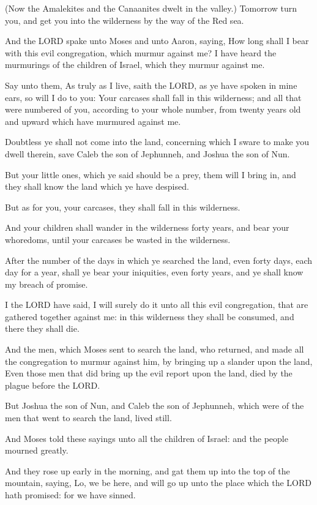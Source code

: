 \Verse (Now the Amalekites and the Canaanites dwelt in the valley.)
Tomorrow turn you, and get you into the wilderness by the way of the
Red sea.

\Verse And the LORD spake unto Moses and unto Aaron, saying, \Verse How
long shall I bear with this evil congregation, which murmur against
me? I have heard the murmurings of the children of Israel, which they
murmur against me.

\Verse Say unto them, As truly as I live, saith the LORD, as ye have
spoken in mine ears, so will I do to you: \Verse Your carcases shall
fall in this wilderness; and all that were numbered of you, according
to your whole number, from twenty years old and upward which have
murmured against me.

\Verse Doubtless ye shall not come into the land, concerning which I
sware to make you dwell therein, save Caleb the son of Jephunneh, and
Joshua the son of Nun.

\Verse But your little ones, which ye said should be a prey, them will
I bring in, and they shall know the land which ye have despised.

\Verse But as for you, your carcases, they shall fall in this
wilderness.

\Verse And your children shall wander in the wilderness forty years,
and bear your whoredoms, until your carcases be wasted in the
wilderness.

\Verse After the number of the days in which ye searched the land, even
forty days, each day for a year, shall ye bear your iniquities, even
forty years, and ye shall know my breach of promise.

\Verse I the LORD have said, I will surely do it unto all this evil
congregation, that are gathered together against me: in this
wilderness they shall be consumed, and there they shall die.

\Verse And the men, which Moses sent to search the land, who returned,
and made all the congregation to murmur against him, by bringing up a
slander upon the land, \Verse Even those men that did bring up the evil
report upon the land, died by the plague before the LORD.

\Verse But Joshua the son of Nun, and Caleb the son of Jephunneh, which
were of the men that went to search the land, lived still.

\Verse And Moses told these sayings unto all the children of Israel:
and the people mourned greatly.

\Verse And they rose up early in the morning, and gat them up into the
top of the mountain, saying, Lo, we be here, and will go up unto the
place which the LORD hath promised: for we have sinned.

